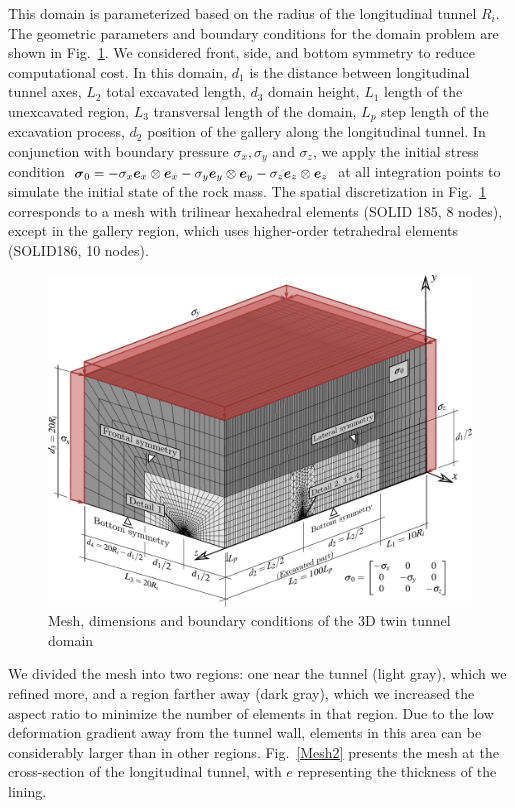 \documentclass[a4paper,fleqn]{cas-sc}
\begin{document}
This domain is parameterized based on the radius of the longitudinal tunnel $R_i$. The geometric parameters and boundary conditions for the domain problem are shown in Fig.~\ref{Mesh1}. We considered front, side, and bottom symmetry to reduce computational cost. In this domain, $d_1$ is the distance between longitudinal tunnel axes, $L_2$ total excavated length, $d_3$ domain height, $L_1$ length of the unexcavated region, $L_3$ transversal length of the domain, $L_p$ step length of the excavation process, $d_2$ position of the gallery along the longitudinal tunnel. In conjunction with boundary pressure $\sigma_x, \sigma_y$ and $\sigma_z$, we apply the initial stress condition $\boldsymbol{\sigma}_0 = -\sigma_x \boldsymbol{e}_x \otimes \boldsymbol{e}_x -\sigma_y \boldsymbol{e}_y \otimes \boldsymbol{e}_y -\sigma_z \boldsymbol{e}_z \otimes \boldsymbol{e}_z$ at all integration points to simulate the initial state of the rock mass. The spatial discretization in Fig.~\ref{Mesh1} corresponds to a mesh with trilinear hexahedral elements (SOLID 185, 8 nodes), except in the gallery region, which uses higher-order tetrahedral elements (SOLID186, 10 nodes). 
\begin{figure}[h!]
	\centering
	\includegraphics[scale=0.5]{Mesh1.pdf}
	\caption{Mesh, dimensions and boundary conditions of the 3D twin tunnel domain}
	\label{Mesh1}
\end{figure}
We divided the mesh into two regions: one near the tunnel (light gray), which we refined more, and a region farther away (dark gray), which we increased the aspect ratio to minimize the number of elements in that region. Due to the low deformation gradient away from the tunnel wall, elements in this area can be considerably larger than in other regions. Fig.~\ref{Mesh2} presents the mesh at the cross-section of the longitudinal tunnel, with $e$ representing the thickness of the lining.
\end{document}
